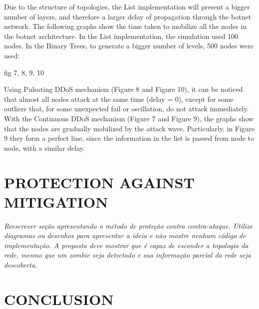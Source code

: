 \documentclass[a4paper,twoside]{article}
\begin{document}
Due to the structure of topologies, the List implementation will present a bigger number of layers, and therefore a larger delay of propagation through the botnet network.
The following graphs show the time taken to mobilize all the nodes in the botnet architecture. In the List implementation, the simulation used 100 nodes. In the Binary Trees, to generate a bigger
number of levels, 500 nodes were used:

fig 7, 8, 9, 10

Using Pulsating DDoS mechanism (Figure 8 and Figure 10), it can be noticed that almost all nodes attack at the same time (delay = 0), except for some outliers that, for some unexpected fail or oscillation, do not attack immediately. With the Continuous DDoS mechanism (Figure 7 and Figure 9), the graphs show that the nodes are gradually mobilized by the attack wave. Particularly, in Figure 9 they form a perfect line, since the information in the list is passed from node to node, with a similar delay.

\section{\uppercase{Protection against mitigation}} \label{sec:protection}

\emph{Reescrever seção apresentando o método de proteção contra contra-ataque. Utilize diagramas ou desenhos para apresentar a ideia e não mostre nenhum código de implementação. A proposta deve mostrar que é capaz de esconder a topologia da rede, mesmo que um zombie seja detectado e sua informação parcial da rede seja descoberta.}



\section{\uppercase{Conclusion}} \label{sec:conclusion}
\end{document}
